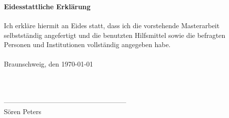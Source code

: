 \clearpage
\pagestyle{empty}
\textbf{Eidesstattliche Erkl\"arung}
\\
\\
Ich erkl\"are hiermit an Eides statt, dass ich die vorstehende Masterarbeit selbstst\"andig angefertigt und die benutzten Hilfsmittel sowie die befragten Personen und Institutionen vollst\"andig angegeben habe.\\
\\
Braunschweig, den \today\\
\\
\\
\\
------------------------------------------------------\\
S\"oren Peters